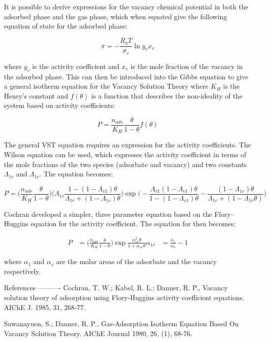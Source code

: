 It is possible to derive expressions for the vacancy chemical potential in both
the adsorbed phase and the gas phase, which when equated give the following equation
of state for the adsorbed phase:

\begin{equation}
    \pi = - \frac{R_g T}{\sigma_v} \ln{y_v x_v}
\end{equation}

where \(y_v\) is the activity coefficient and  \(x_v\) is the mole fraction of
the vacancy in the adsorbed phase.
This can then be introduced into the Gibbs equation to give a general isotherm equation
for the Vacancy Solution Theory where \(K_H\) is the Henry’s constant and
\(f(\theta)\) is a function that describes the non-ideality of the system based
on activity coefficients:

\begin{equation}
    P = \frac{n_{ads}}{K_H} \frac{\theta}{1-\theta} f(\theta)
\end{equation}

The general VST equation requires an expression for the activity coefficients.
The Wilson equation can be used, which expresses the activity coefficient in terms
of the mole fractions of the two species (adsorbate and vacancy) and two constants
\(\Lambda_{1v}\) and \(\Lambda_{1v}\). The equation becomes:

\begin{equation}
P = \bigg( \frac{n_{ads}}{K_H} \frac{\theta}{1-\theta} \bigg)
    \bigg( \Lambda_{1v} \frac{1-(1-\Lambda_{v1})\theta}{\Lambda_{1v}+(1-\Lambda_{1v})\theta} \bigg)
    \exp{\bigg( -\frac{\Lambda_{v1}(1-\Lambda_{v1})\theta}{1-(1-\Lambda_{v1})\theta}
    -\frac{(1 - \Lambda_{1v})\theta}{\Lambda_{1v} + (1-\Lambda_{1v}\theta)} \bigg)}
\end{equation}

Cochran developed a simpler, three parameter equation based on
the Flory–Huggins equation for the activity coefficient.
The equation for then becomes:

\begin{align}
    P &= \bigg( \frac{n_{ads}}{K_H} \frac{\theta}{1-\theta} \bigg)
        \exp{\frac{\alpha^2_{1v}\theta}{1+\alpha_{1v}\theta}}
    \alpha_{1v} &= \frac{\alpha_{1}}{\alpha_{v}} - 1
\end{align}

where \(\alpha_{1}\) and \(\alpha_{v}\) are the molar areas of the adsorbate
and the vacancy respectively.

References
----------
Cochran, T. W.; Kabel, R. L.; Danner, R. P., Vacancy solution theory of
adsorption using Flory-Huggins activity coefficient equations. AIChE J. 1985, 31, 268-77.

Suwanayuen, S.; Danner, R. P., Gas-Adsorption Isotherm Equation Based On
Vacancy Solution Theory. AIChE Journal 1980, 26, (1), 68-76.
